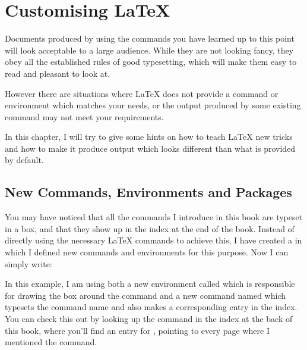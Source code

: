 ﻿%
\chapter{Customising \LaTeX}

\begin{intro}
Documents produced by using the commands you have learned up to this
point will look acceptable to a large audience. While they are not
looking fancy, they obey all the established rules of good
typesetting, which will make them easy to read and pleasant to look at.

However there are situations where \LaTeX{} does not provide a
command or environment which matches your needs, or the output
produced by some existing command may not meet your requirements.

In this chapter, I will try to give some hints on
how to teach \LaTeX{} new tricks and how to make it produce output
which looks different than what is provided by default.
\end{intro}


\section{New Commands, Environments and Packages}

You may have noticed that all the commands I introduce in this
book are typeset in a box, and that they show up in the index at the end
of the book. Instead of directly using the necessary \LaTeX{} commands
to achieve this, I have created a  in which I defined new
commands and environments for this purpose. Now I can simply write:

\begin{example}
\begin{command}
\end{command}
\end{example}

In this example, I am using both a new environment called
 which is responsible for drawing the box around the
command and a new command named  which typesets the command
name and also makes a corresponding entry in the index. You can check
this out by looking up the  command in the index at the back
of this book, where you'll find an entry for , pointing to
every page where I mentioned the  command.

